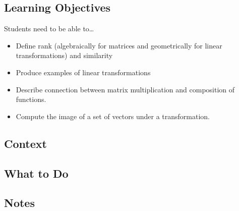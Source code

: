 \documentclass[red]{tutorial}
\theoremstyle{definition}
\theoremstyle{theorem}
\begin{document}
	\begin{instructions}
\subsection*{Learning Objectives}
	Students need to be able to\ldots
	\begin{itemize}
		\item Define rank (algebraically for matrices and geometrically for linear transformations) and similarity
		\item Produce examples of linear transformations
		\item Describe connection between matrix multiplication and composition of functions.
		\item Compute the image of a set of vectors under a transformation.
	\end{itemize}

\subsection*{Context}


\subsection*{What to Do}

	

\subsection*{Notes}

	\end{instructions}
\end{document}
